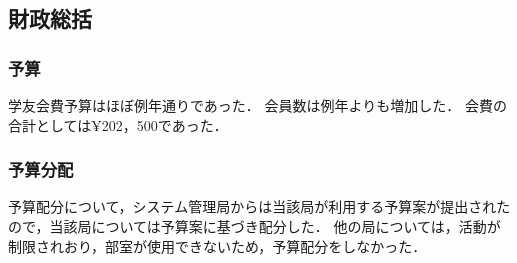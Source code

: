 \subsection*{財政総括}


\subsubsection*{予算}
学友会費予算はほぼ例年通りであった．
会員数は例年よりも増加した． 
会費の合計としては¥202，500であった．

\subsubsection*{予算分配}
予算配分について，システム管理局からは当該局が利用する予算案が提出されたので，当該局については予算案に基づき配分した．
他の局については，活動が制限されおり，部室が使用できないため，予算配分をしなかった．
